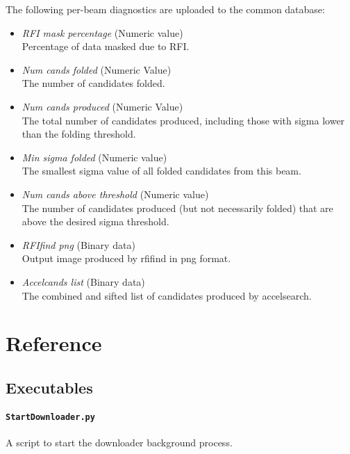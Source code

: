 The following per-beam diagnostics are uploaded to the common database:
\begin{itemize}
    \item \textit{RFI mask percentage} (Numeric value) \hfill \\
        Percentage of data masked due to RFI.

    \item \textit{Num cands folded} (Numeric Value) \hfill \\
        The number of candidates folded.

    \item \textit{Num cands produced} (Numeric Value) \hfill \\
        The total number of candidates produced, including those with sigma lower than the folding threshold.

    \item \textit{Min sigma folded} (Numeric value) \hfill \\
        The smallest sigma value of all folded candidates from this beam.

    \item \textit{Num cands above threshold} (Numeric value) \hfill \\
        The number of candidates produced (but not necessarily folded) that are above the desired sigma threshold.
    
    \item \textit{RFIfind png} (Binary data) \hfill \\
        Output image produced by rfifind in png format.

    \item \textit{Accelcands list} (Binary data) \hfill \\
        The combined and sifted list of candidates produced by accelsearch.
\end{itemize}


\section{Reference}
\subsection{Executables}
\paragraph{\texttt{StartDownloader.py}}
A script to start the downloader background process.

